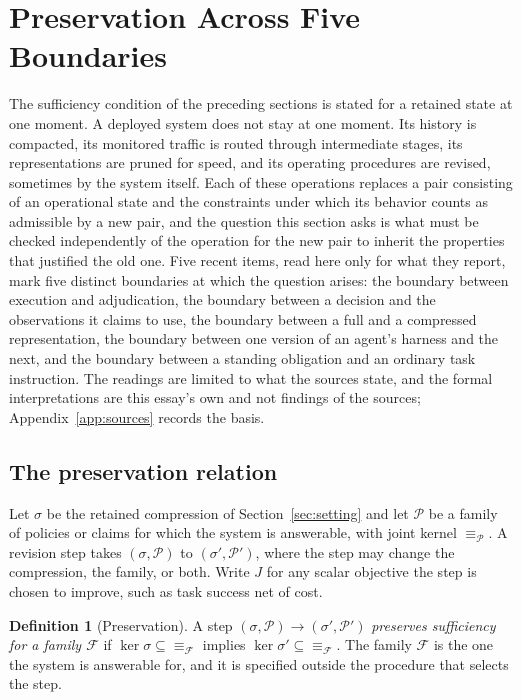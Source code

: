 \documentclass[11pt]{article}
\theoremstyle{definition}
\newtheorem{definition}{Definition}
\theoremstyle{remark}
\newcommand{\Pol}{\mathcal{P}}
\newcommand{\eqv}[1]{\equiv_{#1}}
\begin{document}
\section{Preservation Across Five Boundaries}\label{sec:boundaries}

The sufficiency condition of the preceding sections is stated for a retained state at one moment. A deployed system does not stay at one moment. Its history is compacted, its monitored traffic is routed through intermediate stages, its representations are pruned for speed, and its operating procedures are revised, sometimes by the system itself. Each of these operations replaces a pair consisting of an operational state and the constraints under which its behavior counts as admissible by a new pair, and the question this section asks is what must be checked independently of the operation for the new pair to inherit the properties that justified the old one. Five recent items, read here only for what they report, mark five distinct boundaries at which the question arises: the boundary between execution and adjudication, the boundary between a decision and the observations it claims to use, the boundary between a full and a compressed representation, the boundary between one version of an agent's harness and the next, and the boundary between a standing obligation and an ordinary task instruction. The readings are limited to what the sources state, and the formal interpretations are this essay's own and not findings of the sources; Appendix~\ref{app:sources} records the basis.

\subsection{The preservation relation}

Let $\sigma$ be the retained compression of Section~\ref{sec:setting} and let $\Pol$ be a family of policies or claims for which the system is answerable, with joint kernel $\eqv{\Pol}$. A revision step takes $(\sigma,\Pol)$ to $(\sigma',\Pol')$, where the step may change the compression, the family, or both. Write $J$ for any scalar objective the step is chosen to improve, such as task success net of cost.

\begin{definition}[Preservation]\label{def:preserve}
A step $(\sigma,\Pol)\to(\sigma',\Pol')$ \emph{preserves sufficiency for a family $\mathcal{F}$} if $\ker\sigma\subseteq\eqv{\mathcal{F}}$ implies $\ker\sigma'\subseteq\eqv{\mathcal{F}}$. The family $\mathcal{F}$ is the one the system is answerable for, and it is specified outside the procedure that selects the step.
\end{definition}
\end{document}

